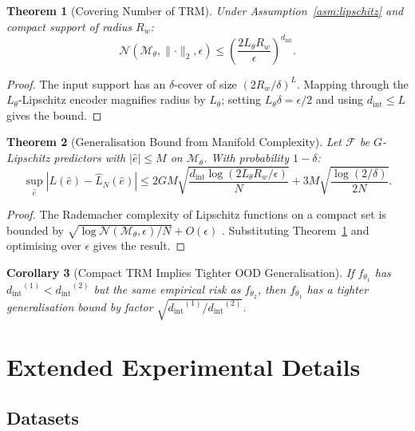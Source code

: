 \documentclass[10pt]{article}
\newtheorem{theorem}{Theorem}[section]
\newtheorem{corollary}[theorem]{Corollary}
\theoremstyle{definition}
\theoremstyle{remark}
\newcommand{\trm}{\mathcal{M}_\theta}
\newcommand{\norm}[1]{\lVert #1 \rVert}
\newcommand{\dint}{\ensuremath{d_{\mathrm{int}}}}
\begin{document}
\begin{theorem}[Covering Number of TRM]
\label{thm:covering_app}
Under Assumption~\ref{asm:lipschitz} and compact support of radius $R_w$:
\[
  \mathcal{N}(\trm,\norm{\cdot}_2, \epsilon)
  \leq \left(\frac{2L_\theta R_w}{\epsilon}\right)^{\dint}.
\]
\end{theorem}
\begin{proof}
The input support has an $\delta$-cover of size $(2R_w/\delta)^L$.
Mapping through the $L_\theta$-Lipschitz encoder magnifies radius by
$L_\theta$; setting $L_\theta\delta = \epsilon/2$ and using
$\dint \leq L$ gives the bound.
\end{proof}

\begin{theorem}[Generalisation Bound from Manifold Complexity]
\label{thm:gen_bound_app}
Let $\mathcal{F}$ be $G$-Lipschitz predictors with $|\hat{e}| \leq M$ on
$\trm$. With probability $1-\delta$:
\[
  \sup_{\hat{e}}|L(\hat{e}) - \hat{L}_N(\hat{e})|
  \leq 2GM\sqrt{\frac{\dint\log(2L_\theta R_w/\epsilon)}{N}}
  + 3M\sqrt{\frac{\log(2/\delta)}{2N}}.
\]
\end{theorem}
\begin{proof}
The Rademacher complexity of Lipschitz functions on a compact set is bounded
by $\sqrt{\log\mathcal{N}(\trm,\epsilon)/N} + O(\epsilon)$
\citep{shalev2014understanding}.
Substituting Theorem~\ref{thm:covering_app} and optimising over $\epsilon$
gives the result.
\end{proof}

\begin{corollary}[Compact TRM Implies Tighter OOD Generalisation]
\label{cor:low_id_app}
If $f_{\theta_1}$ has $\dint^{(1)} < \dint^{(2)}$ but the same empirical
risk as $f_{\theta_2}$, then $f_{\theta_1}$ has a tighter generalisation
bound by factor $\sqrt{\dint^{(1)}/\dint^{(2)}}$.
\end{corollary}

\section{Extended Experimental Details}
\label{app:exp_details}

\subsection{Datasets}
\end{document}
